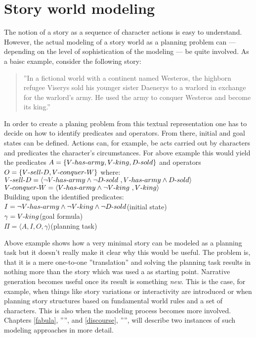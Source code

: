 \section{Story world modeling}\label{modeling}
The notion of a story as a sequence of character actions is easy to understand. However, the actual modeling of a story world as a planning problem can --- depending on the level of sophistication of the modeling --- be quite involved. As a baisc example, consider the following story:
\begin{quote}
''In a fictional world with a continent named Westeros, the highborn refugee Viserys sold his younger sister Daenerys to a warlord in exchange for the warlord's army. He used the army to conquer Westeros and become its king.''
\end{quote}
In order to create a planing problem from this textual representation one has to decide on how to identify predicates and operators. From there, initial and goal states can be defined. Actions can, for example, be acts carried out by characters and predicates the character's circumstances. For above example this would yield the predicates $A=\{V\text{-} has\text{-} army,V\text{-} king,D\text{-} sold\}$ and operators $O=\{V\text{-} sell\text{-} D,V\text{-} conquer\text{-} W\}$ where:\\
$V\text{-} sell\text{-} D=\langle\neg V\text{-} has\text{-} army\land\neg D\text{-} sold\ ,V\text{-} has\text{-} army\land D\text{-} sold\rangle$\\
$V\text{-} conquer\text{-} W=\langle V\text{-} has\text{-} army\land\neg V\text{-} king\ ,V\text{-} king\rangle$\\
Building upon the identified predicates:\\
$I=\neg V\text{-} has\text{-} army\land\neg V\text{-} king\land\neg D\text{-} sold$\hphantom{tabtabtb}(initial state)\\
$\gamma= V\text{-} king$\hphantom{tabtabtabtabtabtabtabtabtabtaataatl}(goal formula)\\
$\Pi=\langle A,I,O,\gamma\rangle$\hphantom{tabtabtabtabtabtabtabtabtabtabl}(planning task)

Above example shows how a very minimal story can be modeled as a planning task but it doesn't really make it clear why this would be useful. The problem is, that it is a mere one-to-one ''translation'' and solving the planning task results in nothing more than the story which was used a as starting point. Narrative generation becomes useful once its result is something \emph{new}. This is the case, for example, when things like story variations or interactivity are introduced or when planning story structures based on fundamental world rules and a set of characters. This is also when the modeling process becomes more involved. Chapters \ref{fabula}, '''', and \ref{discourse}, '''', will describe two instances of such modeling approaches in more detail.

